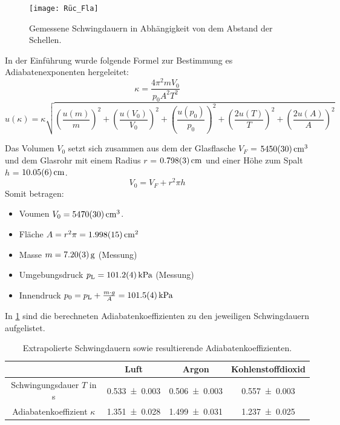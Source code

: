 \documentclass[
	a4paper,
	12pt,
	pagesize,
	ngerman
]{scrartcl}
\begin{document}
	\begin{figure}[H]
		\texttt{[image: Rüc\_Fla]}
		\centering
		\caption{Gemessene Schwingdauern in Abhängigkeit von dem Abstand der Schellen.}
		\label{fig_Rüc_Fla}
		\centering
	\end{figure} 

	In der Einführung wurde folgende Formel zur Bestimmung es Adiabatenexponenten hergeleitet:
	\begin{equation}
	\kappa = \frac{4\pi^2mV_0}{p_0 A^2 T^2}
	\label{eq_Rüc_Fla_Kappa}
	\end{equation}
	\begin{equation}
	u(\kappa) = \kappa \sqrt{\left(\frac{u(m)}{m}\right)^2+\left(\frac{u(V_0)}{V_0}\right)^2+\left(\frac{u(p_0)}{p_0}\right)^2+\left(\frac{2u(T)}{T}\right)^2+\left(\frac{2u(A)}{A}\right)^2}
	\end{equation}
	
	Das Volumen $V_0$ setzt sich zusammen aus dem der Glasflasche $V_F$ = $\SI{5450+-30}{cm^3}$ und dem Glasrohr mit einem Radius $r$ = $\SI{0,798+-0,003}{cm}$ und einer Höhe zum Spalt $h$ = $\SI{10,05+-0.06}{cm}$.
	\begin{equation}
		V_0 = V_F + r^2 \pi h
	\end{equation}
	Somit betragen:
	\begin{itemize}
		\item Voumen $V_0 = \SI{5470+-30}{cm^3}$.
		\item Fläche $A = r^2\pi = \SI{1,998+-0,015}{cm^2}$
		\item Masse $m = \SI{7,2+-0,03}{g}$ (Messung)
		\item Umgebungsdruck $p_\text{L}=\SI{101,2+-0,4}{kPa}$ (Messung)
		\item Innendruck $p_0 = p_\text{L} + \frac{m\cdot g}{A} = \SI{101,5+-0,4}{kPa}$ 
	\end{itemize}
	In \cref{tab_Rüc_Fla} sind die berechneten Adiabatenkoeffizienten zu den jeweiligen Schwingdauern aufgelistet.
	
	\begin{table}[H]
		\centering
		\begin{tabular}{ c | c | c | c}
			&Luft & Argon  & Kohlenstoffdioxid\\ \hline
			Schwingungsdauer $T$ in s&\SI{0,533+-0,003}{}&\SI{0,506+-0,003}{} & \SI{0,557+-0,003}{}\\
			Adiabatenkoeffizient $\kappa$ &\SI{1,351+-0,028}{}&\SI{1,499+-0,031}{}&\SI{1,237+-0,025}{}\\
		\end{tabular}
		\caption{Extrapolierte Schwingdauern sowie resultierende Adiabatenkoeffizienten.}
		\label{tab_Rüc_Fla} 
	\end{table}
	
\end{document}
